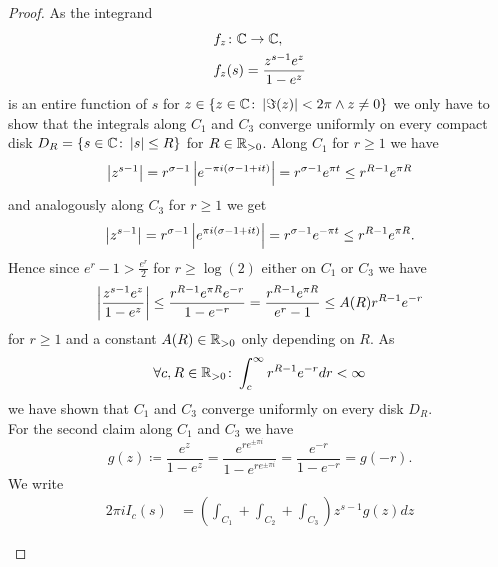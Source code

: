 \begin{proof}
	As the integrand
\begin{equation*}
\begin{aligned}
	&f_z \colon \mathbb{C} \to \mathbb{C},\\
	&f_z(s) = \frac{z^{s - 1} e^z}{1 - e^z}
\end{aligned}
\end{equation*}
	is an entire function of $s$ for $z \in \{ z \in \mathbb{C} \colon \left|\Im(z)\right| < 2 \pi \land z \neq 0 \}$ we only have to show that the integrals along $C_1$ and $C_3$ converge uniformly on every compact disk $D_R = \{ s \in \mathbb{C} \colon \left|s\right| \leq R \}$ for $R \in \mathbb{R}_{> 0}$. Along $C_1$ for $r \geq 1$ we have
\begin{equation*}
	\left|z^{s - 1}\right| = r^{\sigma - 1} \left|e^{-\pi i (\sigma - 1 + i t)}\right| = r^{\sigma - 1} e^{\pi t} \leq r^{R - 1} e^{\pi R}
\end{equation*}
	and analogously along $C_3$ for $r \geq 1$ we get
\begin{equation*}
	\left|z^{s - 1}\right| = r^{\sigma - 1} \left|e^{\pi i (\sigma - 1 + i t)}\right| = r^{\sigma - 1} e^{-\pi t} \leq r^{R - 1} e^{\pi R}.
\end{equation*}
	Hence since $e^r - 1 > \frac{e^r}{2}$ for $r \geq \log(2)$ either on $C_1$ or $C_3$ we have
\begin{equation*}
	\left|\frac{z^{s - 1} e^z}{1 - e^z}\right| \leq \frac{r^{R - 1} e^{\pi R} e^{-r}}{1 - e^{-r}} = \frac{r^{R - 1} e^{\pi R}}{e^{r} - 1} \leq A(R) r^{R - 1} e^{-r}
\end{equation*}
	for $r \geq 1$ and a constant $A(R) \in \mathbb{R}_{> 0}$ only depending on $R$. As
\begin{equation*}
	\forall c, R \in \mathbb{R}_{> 0} \colon \int _c ^\infty r^{R - 1} e^{-r} dr < \infty
\end{equation*}
	we have shown that $C_1$ and $C_3$ converge uniformly on every disk $D_R$. \\
	For the second claim along $C_1$ and $C_3$ we have 
\begin{equation*}
	g(z) \coloneqq \frac{e^z}{1 - e^z} = \frac{e^{r e^{\pm \pi i}}}{1 - e^{r e^{\pm \pi i}}} = \frac{e^{-r}}{1 - e^{-r}} = g(-r).
\end{equation*}
	We write
\begin{equation*}
\begin{aligned}
	2 \pi i I_c(s)
	&= \left(\int _{C_1} + \int _{C_2} + \int _{C_3}\right) z^{s - 1} g(z) dz \\
	&\begin{aligned}

\end{aligned}
\end{aligned}
\end{equation*}
\end{proof}
